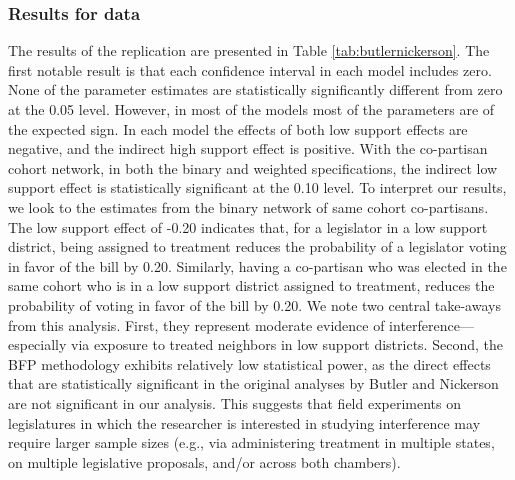 \documentclass[12pt]{article}
\begin{document}
\subsubsection{Results for \citet{butler2011can} data}

The results of the \citet{butler2011can} replication are presented in Table \ref{tab:butlernickerson}.  The first notable result is that each confidence interval in each model includes zero. None of the parameter estimates are statistically significantly different from zero at the 0.05 level. However, in most of the models most of the parameters are of the expected sign. In each model the effects of both low support effects are negative, and the indirect high support effect is positive. With the co-partisan cohort network, in both the binary and weighted specifications, the indirect low support effect is statistically significant at the 0.10 level.  To interpret our results, we look to the estimates from the binary network of same cohort co-partisans. The low support effect of -0.20 indicates that, for a legislator in a low support district, being assigned to treatment reduces the probability of a legislator voting in favor of the bill by 0.20. Similarly, having a co-partisan who was elected in the same cohort who is in a low support district assigned to treatment, reduces the probability of voting in favor of the bill by 0.20. We note two central take-aways from this analysis. First, they represent moderate evidence of interference---especially via exposure to treated neighbors in low support districts. Second, the BFP methodology exhibits relatively low statistical power, as the direct effects that are statistically significant in the original analyses by Butler and Nickerson are not significant in our analysis. This suggests that field experiments on legislatures in which the researcher is interested in studying interference may require larger sample sizes (e.g., via administering treatment in multiple states, on multiple legislative proposals, and/or across both chambers).
\end{document}
